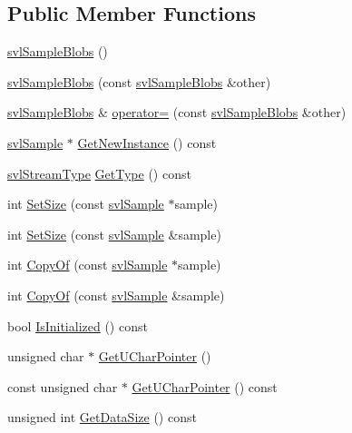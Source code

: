 \subsection*{Public Member Functions}
\begin{DoxyCompactItemize}
\item 
\hyperlink{classsvl_sample_blobs_adf04bcb647530a243efed9b7aef4ad64}{svl\-Sample\-Blobs} ()
\item 
\hyperlink{classsvl_sample_blobs_a25d3dd461d80d40fd4efd5a481254de5}{svl\-Sample\-Blobs} (const \hyperlink{classsvl_sample_blobs}{svl\-Sample\-Blobs} \&other)
\item 
\hyperlink{classsvl_sample_blobs}{svl\-Sample\-Blobs} \& \hyperlink{classsvl_sample_blobs_aec51edec6577d5c45971852d780587b4}{operator=} (const \hyperlink{classsvl_sample_blobs}{svl\-Sample\-Blobs} \&other)
\item 
\hyperlink{classsvl_sample}{svl\-Sample} $\ast$ \hyperlink{classsvl_sample_blobs_a1cc57aec0f029da6e111d5afa6a5c4f1}{Get\-New\-Instance} () const 
\item 
\hyperlink{svl_definitions_8h_aa00696d338a58db361335a01fd11e122}{svl\-Stream\-Type} \hyperlink{classsvl_sample_blobs_a3a9c555784a9e3884384279d09eb4e53}{Get\-Type} () const 
\item 
int \hyperlink{classsvl_sample_blobs_a5d94baff3a1f48fcefedaefe66f3e663}{Set\-Size} (const \hyperlink{classsvl_sample}{svl\-Sample} $\ast$sample)
\item 
int \hyperlink{classsvl_sample_blobs_a7c45a9ad1338a2bec69c33ea1f06c7b0}{Set\-Size} (const \hyperlink{classsvl_sample}{svl\-Sample} \&sample)
\item 
int \hyperlink{classsvl_sample_blobs_a05bbae50613c0054b53556a022bdc74f}{Copy\-Of} (const \hyperlink{classsvl_sample}{svl\-Sample} $\ast$sample)
\item 
int \hyperlink{classsvl_sample_blobs_a43090f1d88dae372ba1bc69c45afd450}{Copy\-Of} (const \hyperlink{classsvl_sample}{svl\-Sample} \&sample)
\item 
bool \hyperlink{classsvl_sample_blobs_a538e02055a16bb02a05ea958dd225e58}{Is\-Initialized} () const 
\item 
unsigned char $\ast$ \hyperlink{classsvl_sample_blobs_a36ea71ec0f2ade6b938f94eaee74719b}{Get\-U\-Char\-Pointer} ()
\item 
const unsigned char $\ast$ \hyperlink{classsvl_sample_blobs_ada954dc6f05f3122b4d59a2c89abc9ad}{Get\-U\-Char\-Pointer} () const 
\item 
unsigned int \hyperlink{classsvl_sample_blobs_ae15dd796c650f52fd262cc953f42e5e4}{Get\-Data\-Size} () const 

\end{DoxyCompactItemize}
